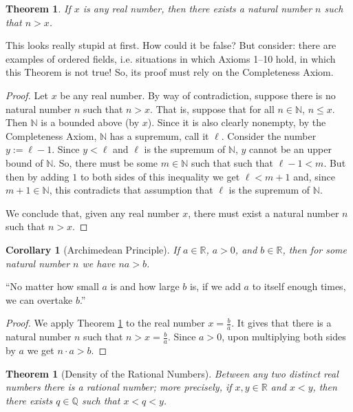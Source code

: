 \documentclass[12pt]{amsart}
\newcommand{\Q}{\mathbb{Q}}
\newcommand{\R}{{\mathbb{R}}}
\newcommand{\N}{\mathbb{N}}
\numberwithin{equation}{section}
\theoremstyle{plain} %
\newtheorem{thm}[equation]{Theorem}
\newtheorem{cor}[equation]{Corollary}
\theoremstyle{definition}
\theoremstyle{remark}
\begin{document}
\begin{thm} \label{thm120}
If $x$ is any real number, then there exists a natural number $n$ such that $n > x$.
\end{thm}

This looks really stupid at first. How could it be false? But consider: there are examples of ordered fields, i.e. situations in which Axioms 1--10 
hold, in which this Theorem is not true! So, its proof must rely on the Completeness Axiom. 


\begin{proof} Let $x$ be any real number. By way of contradiction, suppose there is no natural number $n$ such that $n > x$. That is, suppose that for all $n \in
  \N$, $n \leq x$. Then $\N$ is a bounded above (by $x$). Since it is also clearly nonempty,  by the Completeness
  Axiom, $\N$ has a supremum, call it $\ell$. Consider the number $y := \ell- 1$. Since $y < \ell$ and $\ell$ is the supremum of $\N$,  
$y$ cannot be an upper bound of $\N$. So, there must be some $m \in \N$
  such that such that $\ell-1 < m$. But then by adding $1$ to both sides of this inequality we get $\ell < m+1$ and, 
since $m + 1 \in \N$, this contradicts that assumption that $\ell$ is the supremum of $\N$. 

We conclude that, given any real number $x$,  there must exist a natural number  $n$ such that $n > x$.
\end{proof}

\begin{cor}[Archimedean Principle] If $a \in \R$, $a >0$, and $b \in \R$, then for some natural number $n$ we have $na > b$.
\end{cor}


``No matter how small $a$ is and how large $b$ is, if we add $a$ to itself enough times, we can overtake $b$.''

\begin{proof} We apply Theorem \ref{thm120} to the real number $x = \frac{b}{a}$. It gives that 
  there is a natural number $n$ such that $n > x = \frac{b}{a}$. Since $a > 0$, upon multiplying both sides
  by $a$ we get $n \cdot a  > b$.
\end{proof}

\begin{thm}[Density of the Rational Numbers] 
Between any two distinct  real numbers there is a rational number; more precisely, if $x, y \in \R$ and $x < y$, then there
  exists $q \in \Q$ such that $x < q < y$.
\end{thm}
\end{document}
